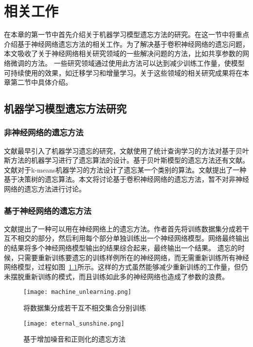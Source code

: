 
\chapter{相关工作}

在本章的第一节中首先介绍关于机器学习模型遗忘方法的研究。在这一节中将重点介绍基于神经网络遗忘方法的相关工作。为了解决基于卷积神经网络的遗忘问题，本文吸收了关于神经网络相关研究领域的一些解决问题的方法，比如共享参数的网络微调的方法。
一些研究领域通过使用此方法可以达到减少训练工作量，使模型可持续使用的效果，如迁移学习和增量学习。关于这些领域的相关研究成果将在本章第二节中具体介绍。

\section{机器学习模型遗忘方法研究}
\subsection{非神经网络的遗忘方法}
文献\cite{yinzhicao2015}最早引入了机器学习遗忘的研究，文献使用了统计查询学习\cite{10.1145/293347.293351}的方法对基于贝叶斯方法的机器学习进行了遗忘算法的设计。基于贝叶斯模型的遗忘方法还有文献\cite{10.1145/3196494.3196517}。
文献\cite{antonio2019}对于k-means机器学习的方法设计了遗忘某一个类别的算法。文献\cite{10.1007/978-3-319-40159-1_19}提出了一种基于决策树的遗忘算法。本文将讨论基于卷积神经网络的遗忘方法，暂不对非神经网络的遗忘方法进行讨论。

\subsection{基于神经网络的遗忘方法}
文献\cite{2019arXiv191203817B}提出了一种可以用在神经网络上的遗忘方法。作者首先将训练数据集分成若干互不相交的部分，然后利用每个部分单独训练出一个神经网络模型。网络最终输出的结果将多个神经网络模型输出的结果综合起来，最终输出一个结果。
遗忘的时候，只需要重新训练要遗忘的训练样例所在的神经网络，而无需重新训练所有神经网络模型，过程如图~\ref{fig:machine_unlearning}所示。这样的方式虽然能够减少重新训练的工作量，但仍未摆脱重新训练的模式，而且训练如此多的神经网络也造成了参数的浪费。
\begin{figure}
    \centering
    \texttt{[image: machine\_unlearning.png]}
    \caption{将数据集分成若干互不相交集合分别训练\cite{2019arXiv191203817B}}
    \label{fig:machine_unlearning}
\end{figure}
\begin{figure}
    \centering
    \texttt{[image: eternal\_sunshine.png]}
    \caption{基于增加噪音和正则化的遗忘方法\cite{2019arXiv191203817B}}
    \label{fig:eternal_sunshine}
\end{figure}

